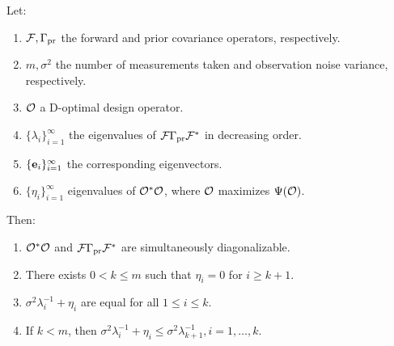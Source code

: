 \documentclass{amsart}
\numberwithin{equation}{section}
\begin{document}
\begin{theorem}\label{thm:char}
  Let:
  \begin{enumerate}
  \item $\mathcal{F}, \Gamma_{\textup{pr}}$ the forward and prior covariance operators, respectively.
  \item $m, \sigma^2$ the number of measurements taken and observation
    noise variance, respectively.
  \item $\mathcal{O}$ a D-optimal design operator.
  \item $\{\lambda_i\}_{i=1}^\infty$ the eigenvalues of
    $\mathcal{F}\Gamma_{\textup{pr}}\mathcal{F}^*$ in decreasing order.
  \item $\{\mathbf{e}_i\}_{i=1}^\infty$ the corresponding eigenvectors.
  \item $\{\eta_i\}_{i=1}^\infty$ eigenvalues of $\mathcal{O}^*\mathcal{O}$, where
    $\mathcal{O}$ maximizes $\Psi(\mathcal{O})$.
  \end{enumerate}
  Then:
  \begin{enumerate}
  \item $\mathcal{O}^*\mathcal{O}$ and $\mathcal{F}\Gamma_{\textup{pr}}\mathcal{F}^*$ are simultaneously diagonalizable.
  \item There exists $0 < k \leq m$ such that $\eta_i = 0$ for $i\geq k+1$.
  \item $\sigma^2\lambda_i^{-1} + \eta_i$ are equal for all $1 \leq i \leq k$.
  \item If $k < m$, then $\sigma^2\lambda_i^{-1} + \eta_i \leq
    \sigma^2\lambda_{k+1}^{-1}, i=1,\dots,k$.
  \end{enumerate}
\end{theorem}


\optimalvsnot
\end{document}
